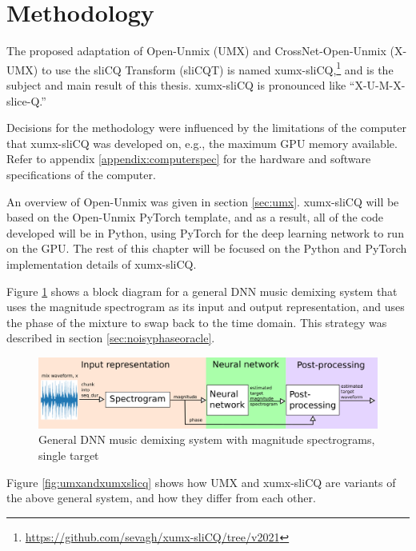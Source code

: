 \documentclass[report.tex]{subfiles}
\begin{document}
\section{Methodology}
\label{sec:methodology}

The proposed adaptation of Open-Unmix (UMX) and CrossNet-Open-Unmix (X-UMX) to use the sliCQ Transform (sliCQT) is named xumx-sliCQ,\footnote{\url{https://github.com/sevagh/xumx-sliCQ/tree/v2021}} and is the subject and main result of this thesis. xumx-sliCQ is pronounced like ``X-U-M-X-slice-Q.''

Decisions for the methodology were influenced by the limitations of the computer that xumx-sliCQ was developed on, e.g., the maximum GPU memory available. Refer to appendix \ref{appendix:computerspec} for the hardware and software specifications of the computer.

An overview of Open-Unmix was given in section \ref{sec:umx}. xumx-sliCQ will be based on the Open-Unmix PyTorch template, and as a result, all of the code developed will be in Python, using PyTorch for the deep learning network to run on the GPU. The rest of this chapter will be focused on the Python and PyTorch implementation details of xumx-sliCQ.

Figure \ref{fig:generalmdx} shows a block diagram for a general DNN music demixing system that uses the magnitude spectrogram as  its input and output representation, and uses the phase of the mixture to swap back to the time domain. This strategy was described in section \ref{sec:noisyphaseoracle}.

\begin{figure}[ht]
	\centering
	\includegraphics[width=\textwidth]{./images-blockdiagrams/generic_mdx.png}
	\caption{General DNN music demixing system with magnitude spectrograms, single target}
	\label{fig:generalmdx}
\end{figure}

Figure \ref{fig:umxandxumxslicq} shows how UMX and xumx-sliCQ are variants of the above general system, and how they differ from each other.
\end{document}
